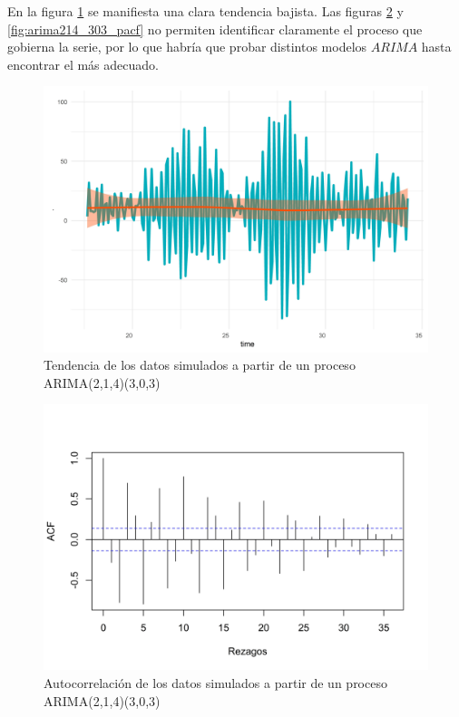 \documentclass[
]{article}
\begin{document}
En la figura \ref{fig:arima214_303_comportamiento} se manifiesta una
clara tendencia bajista. Las figuras \ref{fig:arima214_303_acf} y
\ref{fig:arima214_303_pacf} no permiten identificar claramente el
proceso que gobierna la serie, por lo que habría que probar distintos
modelos \(ARIMA\) hasta encontrar el más adecuado.

\begin{figure}[H]
\includegraphics[width=1\linewidth,height=1\textheight]{Tesis_files/figure-latex/arima214_303_comportamiento-1} \caption{Tendencia de los datos simulados a partir de un proceso ARIMA(2,1,4)(3,0,3)}\label{fig:arima214_303_comportamiento}
\end{figure}

\begin{figure}[H]
\includegraphics[width=1\linewidth,height=1\textheight]{Tesis_files/figure-latex/arima214_303_acf-1} \caption{Autocorrelación de los datos simulados a partir de un proceso ARIMA(2,1,4)(3,0,3)}\label{fig:arima214_303_acf}
\end{figure}
\end{document}
